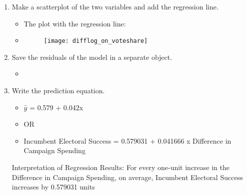 \documentclass[12pt,letterpaper]{article}
\begin{document}
\begin{enumerate}
		\item Make a scatterplot of the two variables and add the regression line. 	

\begin{itemize}
	\item The plot with the regression line:
	\item 
	\begin{figure}[h]
		\centering
		\texttt{[image: difflog\_on\_voteshare]}
	\end{figure} 
\end{itemize}
\vspace{5cm}

		\item Save the residuals of the model in a separate object.
		
\begin{itemize}
	\item 
\end{itemize}


		\item Write the prediction equation.

\begin{itemize}
	\item$\hat{y}$ = 0.579 + 0.042x
	\item OR
	\item Incumbent Electoral Success =  0.579031 + 0.041666 x Difference in Campaign Spending
\end{itemize}

Interpretation of Regression Results: For every one-unit increase in the Difference in Campaign Spending, on average, Incumbent Electoral Success increases by 0.579031 units

	\end{enumerate}
	
\newpage
\end{document}
